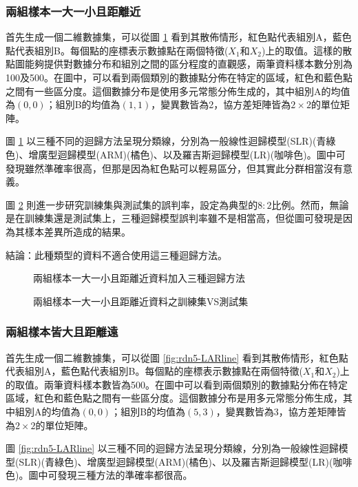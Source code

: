 \subsubsection{兩組樣本一大一小且距離近}

首先生成一個二維數據集，可以從圖 \ref{fig:rdn4-LARline} 看到其散佈情形，紅色點代表組別A，藍色點代表組別B。每個點的座標表示數據點在兩個特徵($X_1$和$X_2$)上的取值。這樣的散點圖能夠提供對數據分布和組別之間的區分程度的直觀感，兩筆資料樣本數分別為100及500。在圖中，可以看到兩個類別的數據點分佈在特定的區域，紅色和藍色點之間有一些區分度。這個數據分布是使用多元常態分佈生成的，其中組別A的均值為$(0, 0)$；組別B的均值為$(1, 1)$，變異數皆為2，協方差矩陣皆為$2 \times 2$的單位矩陣。

圖 \ref{fig:rdn4-LARline} 以三種不同的迴歸方法呈現分類線，分別為一般線性迴歸模型(SLR)(青綠色)、增廣型迴歸模型(ARM)(橘色)、以及羅吉斯迴歸模型(LR)(咖啡色)。圖中可發現雖然準確率很高，但那是因為紅色點可以輕易區分，但其實此分群相當沒有意義。

圖 \ref{fig:rdn4-LARline2} 則進一步研究訓練集與測試集的誤判率，設定為典型的$8:2$比例。然而，無論是在訓練集還是測試集上，三種迴歸模型誤判率雖不是相當高，但從圖可發現是因為其樣本差異所造成的結果。

結論：此種類型的資料不適合使用這三種迴歸方法。
\begin{figure}[h]
    \caption{兩組樣本一大一小且距離近資料加入三種迴歸方法}
    \label{fig:rdn4-LARline}
\end{figure}
\begin{figure}[h]
    \caption{兩組樣本一大一小且距離近資料之訓練集VS測試集}
    \label{fig:rdn4-LARline2}
\end{figure}

\subsubsection{兩組樣本皆大且距離遠}
首先生成一個二維數據集，可以從圖 \ref{fig:rdn5-LARline} 看到其散佈情形，紅色點代表組別A，藍色點代表組別B。每個點的座標表示數據點在兩個特徵($X_1$和$X_2$)上的取值。兩筆資料樣本數皆為500。在圖中可以看到兩個類別的數據點分佈在特定區域，紅色和藍色點之間有一些區分度。這個數據分布是用多元常態分佈生成，其中組別A的均值為$(0, 0)$；組別B的均值為$(5, 3)$，變異數皆為3，協方差矩陣皆為$2 \times 2$的單位矩陣。

圖 \ref{fig:rdn5-LARline} 以三種不同的迴歸方法呈現分類線，分別為一般線性迴歸模型(SLR)(青綠色)、增廣型迴歸模型(ARM)(橘色)、以及羅吉斯迴歸模型(LR)(咖啡色)。圖中可發現三種方法的準確率都很高。

